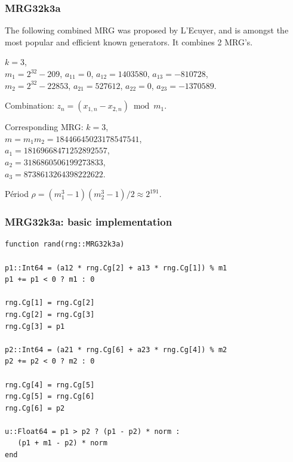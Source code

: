 \documentclass{beamer}
\begin{document}
	\begin{frame}
		\frametitle{MRG32k3a}
		
		The following combined MRG was proposed by L'Ecuyer, and is amongst
		the most popular and efficient known generators.
		It combines 2 MRG's.
		
		\mbox{}
		
		$k=3$, \\
		$m_1 = 2^{32} -209$, $a_{11} = 0$, $a_{12} = 1403580$, $a_{13} = -810728$,\\
		$m_2 = 2^{32}-22853$, $a_{21} = 527612$, $a_{22} = 0$, $a_{23} = -1370589$.\\
		
		\mbox{}
		
		Combination: $z_n = (x_{1,n} - x_{2,n}) \bmod m_1$.
		
		\mbox{}
		
		Corresponding MRG: $k=3$,\\
		$m = m_1 m_2 = 18446645023178547541$, \\
		$a_{1} = 18169668471252892557$,\\
		$a_{2} = 3186860506199273833$,\\ 
		$a_{3} = 8738613264398222622$.
		
		\mbox{}
		
		P\'eriod $\rho = (m_1^3-1)(m_2^3-1)/2 \approx 2^{191}$.
	\end{frame}
	
	\begin{frame}[containsverbatim]
		\frametitle{MRG32k3a: basic implementation}
		
		\begin{footnotesize}
			\begin{verbatim}
function rand(rng::MRG32k3a)

p1::Int64 = (a12 * rng.Cg[2] + a13 * rng.Cg[1]) % m1
p1 += p1 < 0 ? m1 : 0

rng.Cg[1] = rng.Cg[2]
rng.Cg[2] = rng.Cg[3]
rng.Cg[3] = p1

p2::Int64 = (a21 * rng.Cg[6] + a23 * rng.Cg[4]) % m2
p2 += p2 < 0 ? m2 : 0

rng.Cg[4] = rng.Cg[5]
rng.Cg[5] = rng.Cg[6]
rng.Cg[6] = p2

u::Float64 = p1 > p2 ? (p1 - p2) * norm :
   (p1 + m1 - p2) * norm
end
			\end{verbatim}
			\end{footnotesize}
			
		\end{frame}
\end{document}
